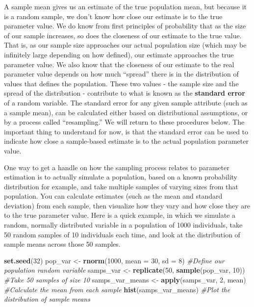 \documentclass[]{book}
\newenvironment{Shaded}{\begin{snugshade}}{\end{snugshade}}
\newcommand{\CommentTok}[1]{\textcolor[rgb]{0.56,0.35,0.01}{\textit{#1}}}
\newcommand{\DataTypeTok}[1]{\textcolor[rgb]{0.13,0.29,0.53}{#1}}
\newcommand{\DecValTok}[1]{\textcolor[rgb]{0.00,0.00,0.81}{#1}}
\newcommand{\KeywordTok}[1]{\textcolor[rgb]{0.13,0.29,0.53}{\textbf{#1}}}
\newcommand{\NormalTok}[1]{#1}
\newcommand{\StringTok}[1]{\textcolor[rgb]{0.31,0.60,0.02}{#1}}
\begin{document}
A sample mean gives us an estimate of the true population mean, but because it is a random sample, we don't know how close our estimate is to the true parameter value. We do know from first principles of probability that as the size of our sample increases, so does the closeness of our estimate to the true value. That is, as our sample size approaches our actual population size (which may be infinitely large depending on how defined), our estimate approaches the true parameter value. We also know that the closeness of our estimate to the real parameter value depends on how much ``spread'' there is in the distribution of values that defines the population. These two values - the sample size and the spread of the distribution - contribute to what is known as the \textbf{standard error} of a random variable. The standard error for any given sample attribute (such as a sample mean), can be calculated either based on distributional assumptions, or by a process called ``resampling.'' We will return to these procedures below. The important thing to understand for now, is that the standard error can be used to indicate how close a sample-based estimate is to the actual population parameter value.

One way to get a handle on how the sampling process relates to parameter estimation is to actually simulate a population, based on a known probability distribution for example, and take multiple samples of varying sizes from that population. You can calculate estimates (such as the mean and standard deviation) from each sample, then visualize how they vary and how close they are to the true parameter value. Here is a quick example, in which we simulate a random, normally distributed variable in a population of 1000 individuals, take 50 random samples of 10 individuals each time, and look at the distribution of sample means across those 50 samples.

\begin{Shaded}
\begin{Highlighting}[]
\KeywordTok{set.seed}\NormalTok{(}\DecValTok{32}\NormalTok{)}
\NormalTok{pop_var <-}\StringTok{ }\KeywordTok{rnorm}\NormalTok{(}\DecValTok{1000}\NormalTok{, }\DataTypeTok{mean =} \DecValTok{30}\NormalTok{, }\DataTypeTok{sd =} \DecValTok{8}\NormalTok{) }\CommentTok{#Define our population random variable}
\NormalTok{samps_var <-}\StringTok{ }\KeywordTok{replicate}\NormalTok{(}\DecValTok{50}\NormalTok{, }\KeywordTok{sample}\NormalTok{(pop_var, }\DecValTok{10}\NormalTok{)) }\CommentTok{#Take 50 samples of size 10}
\NormalTok{samps_var_means <-}\StringTok{ }\KeywordTok{apply}\NormalTok{(samps_var, }\DecValTok{2}\NormalTok{, mean) }\CommentTok{#Calculate the mean from each sample}
\KeywordTok{hist}\NormalTok{(samps_var_means) }\CommentTok{#Plot the distribution of sample means}
\end{Highlighting}
\end{Shaded}
\end{document}

